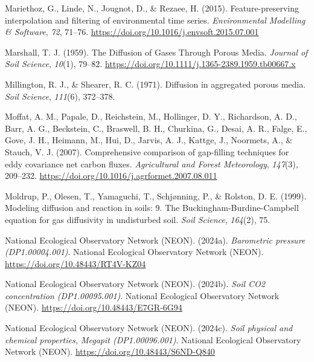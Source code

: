 \documentclass[
  letterpaper,
  DIV=11,
  numbers=noendperiod]{scrartcl}
\newlength{\cslhangindent}
\newenvironment{CSLReferences}[2] %
 {\begin{list}{}{%
  \setlength{\itemindent}{0pt}
  \setlength{\leftmargin}{0pt}
  \setlength{\parsep}{0pt}
  \ifodd #1
   \setlength{\leftmargin}{\cslhangindent}
   \setlength{\itemindent}{-1\cslhangindent}
  \fi
  \setlength{\itemsep}{#2\baselineskip}}}
 {\end{list}}
\begin{document}
\begin{CSLReferences}{1}{0}
Mariethoz, G., Linde, N., Jougnot, D., \& Rezaee, H. (2015).
Feature-preserving interpolation and filtering of environmental time
series. \emph{Environmental Modelling \& Software}, \emph{72}, 71--76.
\url{https://doi.org/10.1016/j.envsoft.2015.07.001}

Marshall, T. J. (1959). The {Diffusion} of {Gases Through Porous Media}.
\emph{Journal of Soil Science}, \emph{10}(1), 79--82.
\url{https://doi.org/10.1111/j.1365-2389.1959.tb00667.x}

Millington, R. J., \& Shearer, R. C. (1971). Diffusion in aggregated
porous media. \emph{Soil Science}, \emph{111}(6), 372--378.

Moffat, A. M., Papale, D., Reichstein, M., Hollinger, D. Y., Richardson,
A. D., Barr, A. G., Beckstein, C., Braswell, B. H., Churkina, G., Desai,
A. R., Falge, E., Gove, J. H., Heimann, M., Hui, D., Jarvis, A. J.,
Kattge, J., Noormets, A., \& Stauch, V. J. (2007). Comprehensive
comparison of gap-filling techniques for eddy covariance net carbon
fluxes. \emph{Agricultural and Forest Meteorology}, \emph{147}(3),
209--232. \url{https://doi.org/10.1016/j.agrformet.2007.08.011}

Moldrup, P., Olesen, T., Yamaguchi, T., Schjønning, P., \& Rolston, D.
E. (1999). Modeling diffusion and reaction in soils: 9. {The
Buckingham-Burdine-Campbell} equation for gas diffusivity in undisturbed
soil. \emph{Soil Science}, \emph{164}(2), 75.

National Ecological Observatory Network (NEON). (2024a).
\emph{Barometric pressure ({DP1}.00004.001)}. National Ecological
Observatory Network (NEON). \url{https://doi.org/10.48443/RT4V-KZ04}

National Ecological Observatory Network (NEON). (2024b). \emph{Soil
{CO2} concentration ({DP1}.00095.001)}. National Ecological Observatory
Network (NEON). \url{https://doi.org/10.48443/E7GR-6G94}

National Ecological Observatory Network (NEON). (2024c). \emph{Soil
physical and chemical properties, {Megapit} ({DP1}.00096.001)}. National
Ecological Observatory Network (NEON).
\url{https://doi.org/10.48443/S6ND-Q840}


\end{CSLReferences}
\end{document}
